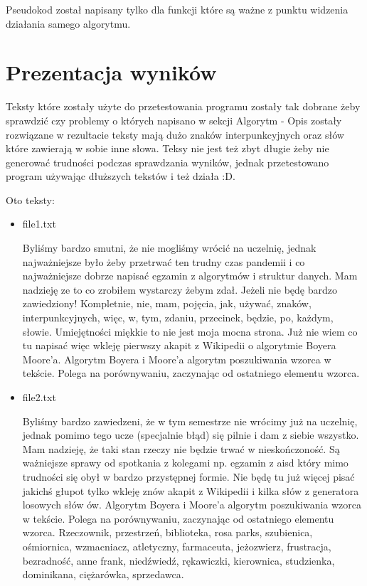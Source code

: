 \documentclass[12pt,a4paper]{article}
\begin{document}
\BlankLine
Pseudokod został napisany tylko dla funkcji które są ważne z punktu widzenia działania samego algorytmu.

\newpage
\section{Prezentacja wyników}
Teksty które zostały użyte do przetestowania programu zostały tak dobrane żeby sprawdzić czy problemy o których napisano w sekcji Algorytm - Opis zostały rozwiązane w rezultacie teksty mają dużo znaków interpunkcyjnych oraz słów które zawierają w sobie inne słowa. Teksy nie jest też zbyt długie żeby nie generować trudności podczas sprawdzania wyników, jednak przetestowano program używając dłuższych tekstów i też działa :D. 

Oto teksty:
\begin{itemize}
    \item file1.txt
    \begin{displayquote}
Byliśmy bardzo smutni, że nie mogliśmy wrócić na uczelnię, jednak najważniejsze było żeby przetrwać ten trudny czas pandemii i co najważniejsze dobrze napisać egzamin z algorytmów i struktur danych. Mam nadzieję ze to co zrobiłem wystarczy żebym zdał. Jeżeli nie będę bardzo zawiedziony! Kompletnie, nie, mam, pojęcia, jak, używać, znaków, interpunkcyjnych, więc, w, tym, zdaniu, przecinek, będzie, po, każdym, słowie. Umiejętności miękkie to nie jest moja mocna strona. Już nie wiem co tu napisać więc wkleję pierwszy akapit z Wikipedii o algorytmie Boyera Moore’a.
Algorytm Boyera i Moore'a algorytm poszukiwania wzorca w tekście. Polega na porównywaniu, zaczynając od ostatniego elementu wzorca.
\end{displayquote}
\item file2.txt
\begin{displayquote}
Byliśmy bardzo zawiedzeni, że w tym semestrze nie wrócimy już na uczelnię, jednak pomimo tego ucze (specjalnie błąd) się pilnie i dam z siebie wszystko. Mam nadzieję, że taki stan rzeczy nie będzie trwać w nieskończoność. Są ważniejsze sprawy od spotkania z kolegami np. egzamin z aisd który mimo trudności się obył w bardzo przystępnej formie. Nie będę tu już więcej pisać jakichś głupot tylko wkleję znów akapit z Wikipedii i kilka słów z generatora losowych słów ów. Algorytm Boyera i Moore'a algorytm poszukiwania wzorca w tekście. Polega na porównywaniu, zaczynając od ostatniego elementu wzorca. Rzeczownik, przestrzeń, biblioteka, rosa parks, szubienica, ośmiornica, wzmacniacz, atletyczny, farmaceuta, jeżozwierz, frustracja, bezradność, anne frank, niedźwiedź, rękawiczki, kierownica, studzienka, dominikana, ciężarówka, sprzedawca.
\end{displayquote}
\end{itemize}
\end{document}
